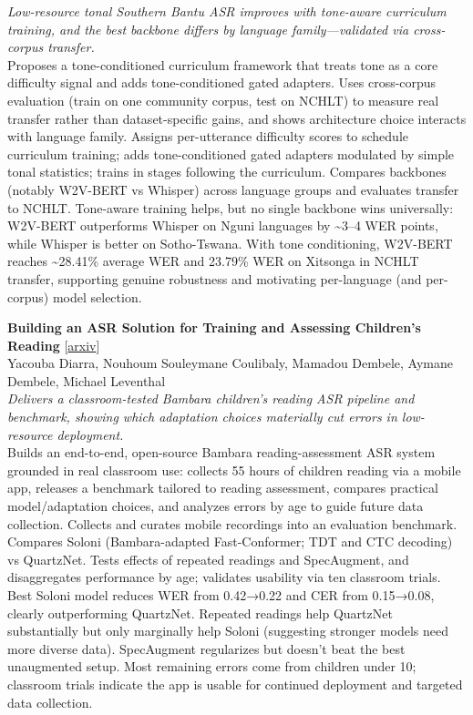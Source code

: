 \documentclass[12pt,letterpaper]{article}
\begin{document}
{\small\textit{Low-resource tonal Southern Bantu ASR improves with tone-aware curriculum training, and the best backbone differs by language family---validated via cross-corpus transfer.}}\\[1pt]
{\footnotesize Proposes a tone-conditioned curriculum framework that treats tone as a core difficulty signal and adds tone-conditioned gated adapters. Uses cross-corpus evaluation (train on one community corpus, test on NCHLT) to measure real transfer rather than dataset-specific gains, and shows architecture choice interacts with language family. Assigns per-utterance difficulty scores to schedule curriculum training; adds tone-conditioned gated adapters modulated by simple tonal statistics; trains in stages following the curriculum. Compares backbones (notably W2V-BERT vs Whisper) across language groups and evaluates transfer to NCHLT. Tone-aware training helps, but no single backbone wins universally: W2V-BERT outperforms Whisper on Nguni languages by \textasciitilde{}3--4 WER points, while Whisper is better on Sotho-Tswana. With tone conditioning, W2V-BERT reaches \textasciitilde{}28.41\% average WER and 23.79\% WER on Xitsonga in NCHLT transfer, supporting genuine robustness and motivating per-language (and per-corpus) model selection.}

\medskip

{\small\textbf{Building an ASR Solution for Training and Assessing Children's Reading}} {\scriptsize[\href{https://arxiv.org/abs/2606.31508}{arxiv}]}\\
{\scriptsize Yacouba Diarra, Nouhoum Souleymane Coulibaly, Mamadou Dembele, Aymane Dembele, Michael Leventhal}\\

{\small\textit{Delivers a classroom-tested Bambara children's reading ASR pipeline and benchmark, showing which adaptation choices materially cut errors in low-resource deployment.}}\\[1pt]
{\footnotesize Builds an end-to-end, open-source Bambara reading-assessment ASR system grounded in real classroom use: collects 55 hours of children reading via a mobile app, releases a benchmark tailored to reading assessment, compares practical model/adaptation choices, and analyzes errors by age to guide future data collection. Collects and curates mobile recordings into an evaluation benchmark. Compares Soloni (Bambara-adapted Fast-Conformer; TDT and CTC decoding) vs QuartzNet. Tests effects of repeated readings and SpecAugment, and disaggregates performance by age; validates usability via ten classroom trials. Best Soloni model reduces WER from 0.42→0.22 and CER from 0.15→0.08, clearly outperforming QuartzNet. Repeated readings help QuartzNet substantially but only marginally help Soloni (suggesting stronger models need more diverse data). SpecAugment regularizes but doesn't beat the best unaugmented setup. Most remaining errors come from children under 10; classroom trials indicate the app is usable for continued deployment and targeted data collection.}
\end{document}
